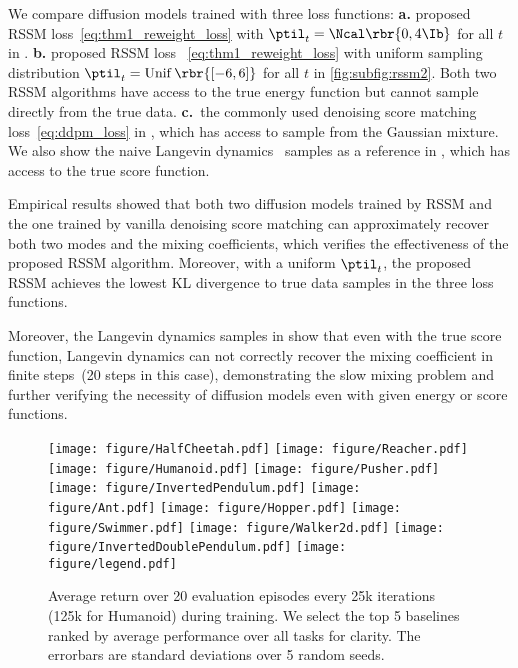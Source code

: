 We compare diffusion models trained with 
 three loss functions: \textbf{a.} proposed RSSM loss~\eqref{eq:thm1_reweight_loss} with $\ptil_t=\Ncal\rbr{0, 4\Ib}$ for all $t$ in . \textbf{b.} proposed RSSM loss ~\eqref{eq:thm1_reweight_loss} with uniform sampling distribution $\ptil_t=\operatorname{Unif}\rbr{[-6, 6]}$ for all $t$ in \ref{fig:subfig:rssm2}. Both two RSSM algorithms have access to the true energy function but cannot sample directly from the true data.  \textbf{c.}~the commonly used denoising score matching loss~\eqref{eq:ddpm_loss} in , which has access to sample from the Gaussian mixture. We also show the naive Langevin dynamics~\cite{parisi1981correlation} samples as a reference in , which has access to the true score function.

 Empirical results showed that both two diffusion models trained by RSSM and the one trained by vanilla denoising score matching can approximately recover both two modes and the mixing coefficients, which verifies the effectiveness of the proposed RSSM algorithm. Moreover, with a uniform $\ptil_t$, the proposed RSSM achieves the lowest KL divergence to true data samples in the three loss functions.

Moreover, the Langevin dynamics samples in  show that even with the true score function, Langevin dynamics can not correctly recover the mixing coefficient in finite steps~(20 steps in this case), demonstrating the slow mixing problem and further verifying the necessity of diffusion models even with given energy or score functions. 
\begin{figure*}[ht]
    \centering
    \texttt{[image: figure/HalfCheetah.pdf]}
    \texttt{[image: figure/Reacher.pdf]}
    \texttt{[image: figure/Humanoid.pdf]}
    \texttt{[image: figure/Pusher.pdf]}
    \texttt{[image: figure/InvertedPendulum.pdf]}
    \texttt{[image: figure/Ant.pdf]}
    \texttt{[image: figure/Hopper.pdf]}
    \texttt{[image: figure/Swimmer.pdf]}
    \texttt{[image: figure/Walker2d.pdf]}
    \texttt{[image: figure/InvertedDoublePendulum.pdf]}
    \texttt{[image: figure/legend.pdf]}
    
    \caption{Average return over 20 evaluation episodes every 25k iterations (125k for Humanoid) during training. We select the top 5 baselines ranked by average performance over all tasks for clarity. The errorbars are standard deviations over 5 random seeds.}
    \label{fig:main}
    
\end{figure*}
